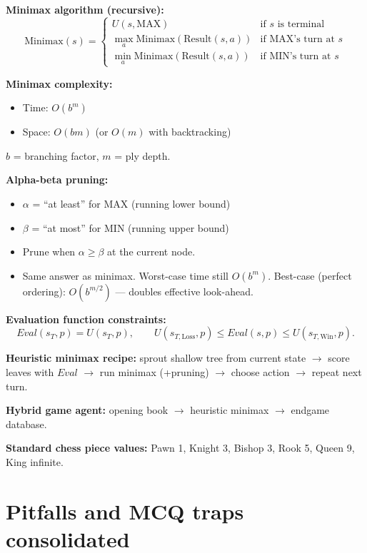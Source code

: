 \documentclass[11pt, a4paper]{article}
\begin{document}
\textbf{Minimax algorithm (recursive):}
\[
\mathrm{Minimax}(s) =
\begin{cases}
U(s, \text{MAX}) & \text{if } s \text{ is terminal} \\
\max_{a} \mathrm{Minimax}(\mathrm{Result}(s, a)) & \text{if MAX's turn at } s \\
\min_{a} \mathrm{Minimax}(\mathrm{Result}(s, a)) & \text{if MIN's turn at } s
\end{cases}
\]

\textbf{Minimax complexity:}
\begin{itemize}[itemsep=0pt, topsep=0pt]
  \item Time: $O(b^m)$
  \item Space: $O(b m)$ (or $O(m)$ with backtracking)
\end{itemize}
$b$ = branching factor, $m$ = ply depth.

\textbf{Alpha-beta pruning:}
\begin{itemize}[itemsep=0pt, topsep=0pt]
  \item $\alpha$ = ``at least'' for MAX (running lower bound)
  \item $\beta$ = ``at most'' for MIN (running upper bound)
  \item Prune when $\alpha \ge \beta$ at the current node.
  \item Same answer as minimax. Worst-case time still $O(b^m)$. Best-case (perfect ordering): $O(b^{m/2})$ — doubles effective look-ahead.
\end{itemize}

\textbf{Evaluation function constraints:}
\[
\mathit{Eval}(s_T, p) = U(s_T, p), \qquad U(s_{T,\text{Loss}}, p) \le \mathit{Eval}(s, p) \le U(s_{T,\text{Win}}, p).
\]

\textbf{Heuristic minimax recipe:} sprout shallow tree from current state $\to$ score leaves with $\mathit{Eval}$ $\to$ run minimax (+pruning) $\to$ choose action $\to$ repeat next turn.

\textbf{Hybrid game agent:} opening book $\to$ heuristic minimax $\to$ endgame database.

\textbf{Standard chess piece values:} Pawn 1, Knight 3, Bishop 3, Rook 5, Queen 9, King infinite.

\section*{Pitfalls and MCQ traps consolidated}
\end{document}
